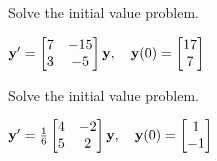 \documentclass{ximera}
\begin{document}
 \begin{problem}\label{exer:10.6.19}
 Solve the initial value problem.
 
$ {\bf y}'= \begin{bmatrix}7&-15\\3&-5\end{bmatrix}{\bf y},\quad {\bf
y}(0)= \begin{bmatrix}17\\7\end{bmatrix}$
\end{problem}

 \begin{problem}\label{exer:10.6.20}
 Solve the initial value problem.
 
$ {\bf y}'=\frac{1}{6} \begin{bmatrix}4&-2\\5&2\end{bmatrix}{\bf y},\quad {\bf
y}(0)= \begin{bmatrix}1\\-1\end{bmatrix}$


\end{problem}
\end{document}
